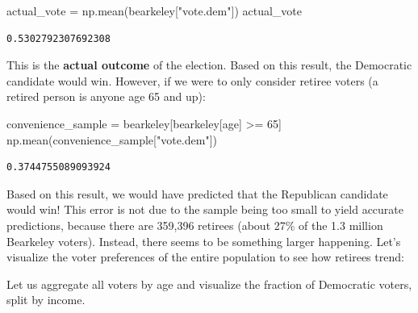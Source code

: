 \documentclass[
  letterpaper,
  DIV=11,
  numbers=noendperiod]{scrreprt}
\newenvironment{Shaded}{\begin{snugshade}}{\end{snugshade}}
\newcommand{\DecValTok}[1]{\textcolor[rgb]{0.68,0.00,0.00}{#1}}
\newcommand{\NormalTok}[1]{\textcolor[rgb]{0.00,0.23,0.31}{#1}}
\newcommand{\OperatorTok}[1]{\textcolor[rgb]{0.37,0.37,0.37}{#1}}
\newcommand{\StringTok}[1]{\textcolor[rgb]{0.13,0.47,0.30}{#1}}
\begin{document}
\begin{Shaded}
\begin{Highlighting}[]
\NormalTok{actual\_vote }\OperatorTok{=}\NormalTok{ np.mean(bearkeley[}\StringTok{"vote.dem"}\NormalTok{])}
\NormalTok{actual\_vote}
\end{Highlighting}
\end{Shaded}

\begin{verbatim}
0.5302792307692308
\end{verbatim}

This is the \textbf{actual outcome} of the election. Based on this
result, the Democratic candidate would win. However, if we were to only
consider retiree voters (a retired person is anyone age 65 and up):

\begin{Shaded}
\begin{Highlighting}[]
\NormalTok{convenience\_sample }\OperatorTok{=}\NormalTok{ bearkeley[bearkeley[}\StringTok{\textquotesingle{}age\textquotesingle{}}\NormalTok{] }\OperatorTok{\textgreater{}=} \DecValTok{65}\NormalTok{]}
\NormalTok{np.mean(convenience\_sample[}\StringTok{"vote.dem"}\NormalTok{])}
\end{Highlighting}
\end{Shaded}

\begin{verbatim}
0.3744755089093924
\end{verbatim}

Based on this result, we would have predicted that the Republican
candidate would win! This error is not due to the sample being too small
to yield accurate predictions, because there are 359,396 retirees (about
27\% of the 1.3 million Bearkeley voters). Instead, there seems to be
something larger happening. Let's visualize the voter preferences of the
entire population to see how retirees trend:

Let us aggregate all voters by age and visualize the fraction of
Democratic voters, split by income.
\end{document}
